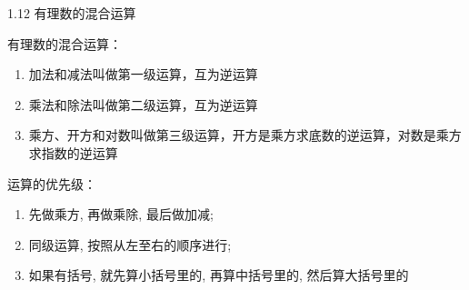 \documentclass[aspectratio=169]{ctexbeamer} %
\date{\today}
\begin{document}
\begin{frame}[t]{1.12 有理数的混合运算}
\begin{spacing}{1.2}
\normalsize
\alert{有理数的混合运算：}
\begin{enumerate}[label={\arabic*.}]
\item 加法和减法叫做第一级运算，互为逆运算
\item 乘法和除法叫做第二级运算，互为逆运算
\item 乘方、开方和对数叫做第三级运算，开方是乘方求底数的逆运算，对数是乘方求指数的逆运算
\end{enumerate}

\alert{运算的优先级：}
\begin{enumerate}[label={\arabic*.}]
\item 先做乘方, 再做乘除, 最后做加减;
\item 同级运算, 按照从左至右的顺序进行;
\item 如果有括号, 就先算小括号里的, 再算中括号里的, 然后算大括号里的
\end{enumerate}
\end{spacing}
\end{frame}
\end{document}
